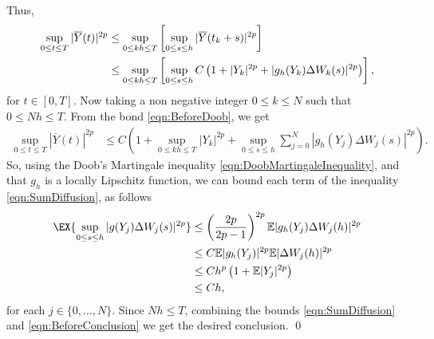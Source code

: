 	Thus, 
	\begin{align}
		\sup_{0\leq t\leq T} |\overline{Y}(t)|^{2p}
		&\leq
			\sup_{0\leq kh\leq T}
			\left[
				\sup_{0\leq s\leq h}
					|\overline{Y}(t_k+s)|^{2p} 
			\right] 
		\notag\\
		&\leq
			\sup_{0\leq kh\leq T} 
			\left[
				\sup_{0\leq s\leq h}
					C 
					\left(
						1 + |Y_k|^{2p} + |g_h(Y_k)\Delta W_k(s)|^{2p}
					\right)
			\right],
		\label{eqn:BeforeDoob}
	\end{align}
	for $t\in [0,T]$.
	Now taking a non negative integer $0 \leq k \leq N$ such that $0\leq Nh \leq T$. From the bond 
	\eqref{eqn:BeforeDoob}, we get
	\begin{align}
		\sup_{0\leq t\leq T} |\overline{Y}(t)|^{2p}
		&\leq 
			C
			\left(
				1
				+
				\sup_{0\leq kh\leq T} 
					|Y_k|^{2p}
					+
					\sup_{0\leq s\leq h}
						\sum_{j=0}^N
							|g_h(Y_j)\Delta W_j(s)|^{2p}
			\right) \label{eqn:SumDiffusion}.
	\end{align}
	So, using the Doob's Martingale inequality \eqref{eqn:DoobMartingaleInequality},
	 and that $g_h$ is a locally 
	Lipschitz function, we can bound each term of the inequality \eqref{eqn:SumDiffusion},  as follows
	\begin{align}
		\EX{
			\sup_{0 \leq s \leq h} |g(Y_j) \Delta W_j(s)|^{2p}
		}
		&\leq
			\left(
				\frac{2p}{2p-1}
			\right)^{2p}
			\m|g_h(Y_j)\Delta W_j(h)|^{2p}
			\notag
			\\
		&\leq
			C \m |g_h(Y_j)|^{2p} \m |\Delta W_j(h)|^{2p} \notag\\
		&\leq
			C h^p
			\left(
				1 + \m|Y_j|^{2p}
			\right) \notag \\
		& \leq C h, \label{eqn:BeforeConclusion}
	\end{align}
	for each $j \in \{0,\dots, N\}$.
	Since $Nh\leq T$, combining the bounds \eqref{eqn:SumDiffusion} and \eqref{eqn:BeforeConclusion} we 
	get the desired conclusion. \qed

